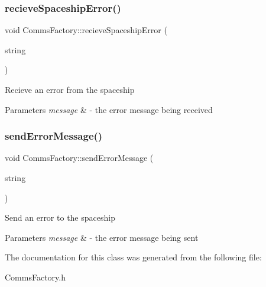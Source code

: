 \subsubsection{\texorpdfstring{recieve\+Spaceship\+Error()}{recieveSpaceshipError()}}
{\footnotesize\ttfamily void Comms\+Factory\+::recieve\+Spaceship\+Error (\begin{DoxyParamCaption}\item[{string}]{ }\end{DoxyParamCaption})}

Recieve an error from the spaceship 
\begin{DoxyParams}{Parameters}
{\em message} & -\/ the error message being received \\
\hline
\end{DoxyParams}
\mbox{\label{classCommsFactory_a5f565ce3e7a75ab2f40dece51adda485}} 
\subsubsection{\texorpdfstring{send\+Error\+Message()}{sendErrorMessage()}}
{\footnotesize\ttfamily void Comms\+Factory\+::send\+Error\+Message (\begin{DoxyParamCaption}\item[{string}]{ }\end{DoxyParamCaption})}

Send an error to the spaceship 
\begin{DoxyParams}{Parameters}
{\em message} & -\/ the error message being sent \\
\hline
\end{DoxyParams}


The documentation for this class was generated from the following file\+:\begin{DoxyCompactItemize}
\item 
Comms\+Factory.\+h\end{DoxyCompactItemize}
